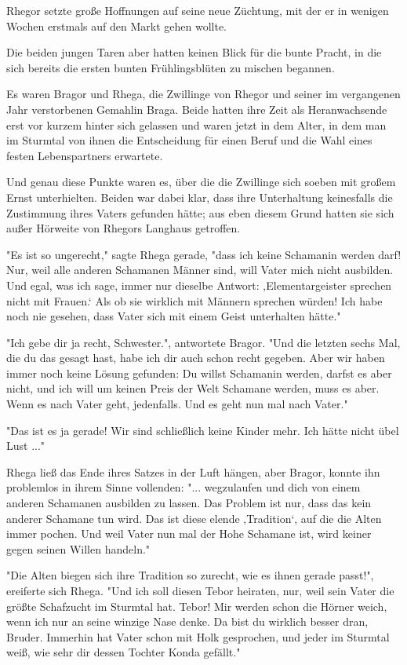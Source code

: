 \documentclass[10pt, a4paper, oneside]{book}
\begin{document}
\begin{multicols}{2}
Rhegor setzte große Hoffnungen auf seine neue Züchtung, mit der er in wenigen Wochen erstmals auf den Markt gehen wollte. 

Die beiden jungen Taren aber hatten keinen Blick für die bunte Pracht, in die sich bereits die ersten bunten Frühlingsblüten zu mischen begannen. 

Es waren Bragor und Rhega, die Zwillinge von Rhegor und seiner im vergangenen Jahr verstorbenen Gemahlin Braga. Beide hatten ihre Zeit als Heranwachsende erst vor kurzem hinter sich gelassen und waren jetzt in dem Alter, in dem man im Sturmtal von ihnen die Entscheidung für einen Beruf und die Wahl eines festen Lebenspartners erwartete. 

Und genau diese Punkte waren es, über die die Zwillinge sich soeben mit großem Ernst unterhielten. Beiden war dabei klar, dass ihre Unterhaltung keinesfalls die Zustimmung ihres Vaters gefunden hätte; aus eben diesem Grund hatten sie sich außer Hörweite von Rhegors Langhaus getroffen. 

"Es ist so ungerecht," sagte Rhega gerade, "dass ich keine Schamanin werden darf! Nur, weil alle anderen Schamanen Männer sind, will Vater mich nicht ausbilden. Und egal, was ich sage, immer nur dieselbe Antwort: ‚Elementargeister sprechen nicht mit Frauen.‘ Als ob sie wirklich mit Männern sprechen würden! Ich habe noch nie gesehen, dass Vater sich mit einem Geist unterhalten hätte." 

"Ich gebe dir ja recht, Schwester.", antwortete Bragor. "Und die letzten sechs Mal, die du das gesagt hast, habe ich dir auch schon recht gegeben. Aber wir haben immer noch keine Lösung gefunden: Du willst Schamanin werden, darfst es aber nicht, und ich will um keinen Preis der Welt Schamane werden, muss es aber. Wenn es nach Vater geht, jedenfalls. Und es geht nun mal nach Vater." 

"Das ist es ja gerade! Wir sind schließlich keine Kinder mehr. Ich hätte nicht übel Lust ..." 

Rhega ließ das Ende ihres Satzes in der Luft hängen, aber Bragor, konnte ihn problemlos in ihrem Sinne vollenden: "... wegzulaufen und dich von einem anderen Schamanen ausbilden zu lassen. Das Problem ist nur, dass das kein anderer Schamane tun wird. Das ist diese elende ‚Tradition‘, auf die die Alten immer pochen. Und weil Vater nun mal der Hohe Schamane ist, wird keiner gegen seinen Willen handeln." 

"Die Alten biegen sich ihre Tradition so zurecht, wie es ihnen gerade passt!", ereiferte sich Rhega. "Und ich soll diesen Tebor heiraten, nur, weil sein Vater die größte Schafzucht im Sturmtal hat. Tebor! Mir werden schon die Hörner weich, wenn ich nur an seine winzige Nase denke. Da bist du wirklich besser dran, Bruder. Immerhin hat Vater schon mit Holk gesprochen, und jeder im Sturmtal weiß, wie sehr dir dessen Tochter Konda gefällt." 


\end{multicols}
\end{document}
